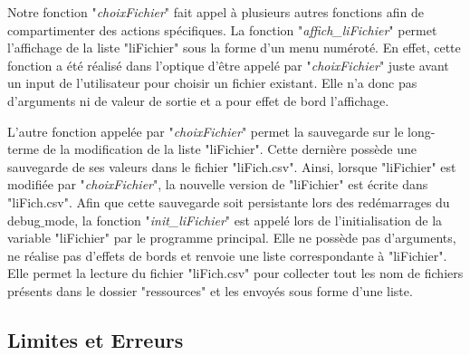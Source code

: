 \documentclass[10pt,a4paper,french,titlepage]{article}
\theoremstyle{definition}
\begin{document}
Notre fonction "\textit{choixFichier}" fait appel à plusieurs autres fonctions afin de compartimenter des actions spécifiques. La fonction "\textit{affich\_liFichier}" permet
l'affichage de la liste "liFichier" sous la forme d'un menu numéroté. En effet, cette fonction a été réalisé dans l'optique d'être appelé par "\textit{choixFichier}" juste avant un input de l'utilisateur pour choisir un fichier existant. Elle n'a donc pas d'arguments ni de valeur de sortie et a pour effet de bord l'affichage. 

L'autre fonction appelée par "\textit{choixFichier}" permet la sauvegarde sur le long-terme de la modification de la liste "liFichier". Cette dernière possède une sauvegarde de ses valeurs dans le fichier "liFich.csv". Ainsi, lorsque "liFichier" est modifiée par "\textit{choixFichier}", la nouvelle version de "liFichier" est écrite dans "liFich.csv". Afin que cette sauvegarde soit persistante lors des redémarrages du debug$\_$mode, la fonction "\textit{init\_liFichier}" est appelé lors de l'initialisation de la variable "liFichier" par le programme principal. Elle ne possède pas d'arguments, ne réalise pas d'effets de bords et renvoie une liste correspondante à "liFichier". Elle permet la lecture du fichier "liFich.csv" pour collecter tout les nom de fichiers présents dans le dossier "ressources" et les envoyés sous forme d'une liste. 
\subsection{Limites et Erreurs}
\end{document}
